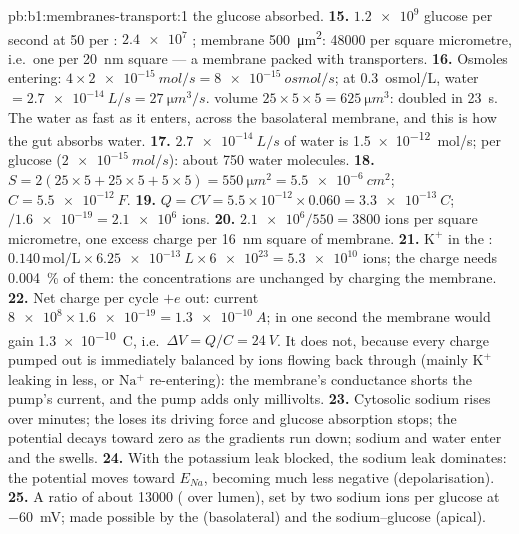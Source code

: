 \begin{solution}{pb:b1:membranes-transport:1}
the glucose absorbed.
\textbf{15.} $\num{1.2e9}$ glucose per second at 50 per :
$\num{2.4e7}$ ; membrane \qty{500}{\micro m^2}: \num{48000}
per square micrometre, i.e.\ one per \qty{20}{nm} square --- a
membrane packed with transporters.
\textbf{16.} Osmoles entering: $4\times\qty{2e-15}{mol/s} =
\qty{8e-15}{osmol/s}$; at \qty{0.3}{osmol/L}, water
$= \qty{2.7e-14}{L/s} = \qty{27}{\micro m^3/s}$.  volume
$25\times 5\times 5 = \qty{625}{\micro m^3}$: doubled in \qty{23}{s}.
The water  as fast as it enters, across the basolateral
membrane, and this is how the gut absorbs water.
\textbf{17.} $\qty{2.7e-14}{L/s}$ of water is \qty{1.5e-12}{mol/s}; per glucose ($\qty{2e-15}{mol/s}$): about 750 water molecules.
\textbf{18.} $S = 2(25\times 5 + 25\times 5 + 5\times 5) =
\qty{550}{\micro m^2} = \qty{5.5e-6}{cm^2}$; $C = \qty{5.5e-12}{F}$.
\textbf{19.} $Q = CV = 5.5\times 10^{-12}\times 0.060 =
\qty{3.3e-13}{C}$; $/\num{1.6e-19} = \num{2.1e6}$ ions.
\textbf{20.} $\num{2.1e6}/550 = 3800$ ions per square micrometre, one excess charge per \qty{16}{nm} square of membrane.
\textbf{21.} $\mathrm{K^+}$ in the : $0.140\,\mathrm{mol/L}\times
\qty{6.25e-13}{L}\times\num{6e23} = \num{5.3e10}$ ions; the charge
needs \qty{0.004}{\%} of them: the concentrations are unchanged by
charging the membrane.
\textbf{22.} Net charge per cycle $+e$ out: current $\num{8e8}\times
\num{1.6e-19} = \qty{1.3e-10}{A}$; in one second the membrane would
gain \qty{1.3e-10}{C}, i.e.\ $\Delta V = Q/C = \qty{24}{V}$. It does
not, because every charge pumped out is immediately balanced by ions
flowing back through  (mainly $\mathrm{K^+}$ leaking in less,
or $\mathrm{Na^+}$ re-entering): the membrane's conductance shorts
the pump's current, and the pump adds only millivolts.
\textbf{23.} Cytosolic sodium rises over minutes; the  loses
its driving force and glucose absorption stops; the potential decays
toward zero as the gradients run down; sodium and water enter and the
 swells.
\textbf{24.} With the potassium leak blocked, the sodium leak
dominates: the potential moves toward $E_{Na}$, becoming much less
negative (depolarisation).
\textbf{25.} A ratio of about \num{13000} ( over lumen), set by
two sodium ions per glucose at \qty{-60}{mV}; made possible by the
 (basolateral) and the sodium--glucose 
(apical).
\end{solution}
